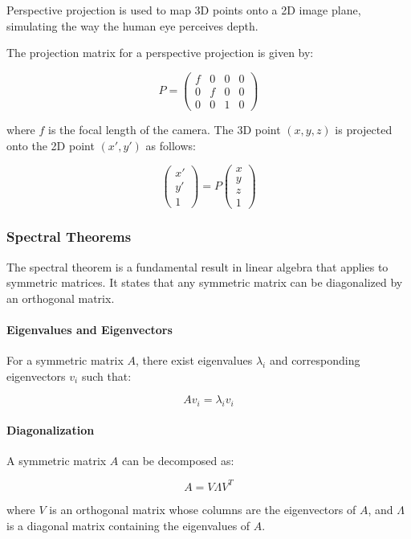 \documentclass[12pt]{article}
\begin{document}
Perspective projection is used to map 3D points onto a 2D image plane, simulating the way the human eye perceives depth.

The projection matrix for a perspective projection is given by:

\[
P =
\begin{pmatrix}
f & 0 & 0 & 0 \\
0 & f & 0 & 0 \\
0 & 0 & 1 & 0
\end{pmatrix}
\]

where \( f \) is the focal length of the camera. The 3D point \((x, y, z)\) is projected onto the 2D point \((x', y')\) as follows:

\[
\begin{pmatrix}
x' \\
y' \\
1
\end{pmatrix}
=
P
\begin{pmatrix}
x \\
y \\
z \\
1
\end{pmatrix}
\]

\subsubsection{Spectral Theorems}

The spectral theorem is a fundamental result in linear algebra that applies to symmetric matrices. It states that any symmetric matrix can be diagonalized by an orthogonal matrix.

\paragraph{Eigenvalues and Eigenvectors}

For a symmetric matrix \( A \), there exist eigenvalues \( \lambda_i \) and corresponding eigenvectors \( v_i \) such that:

\[
A v_i = \lambda_i v_i
\]

\paragraph{Diagonalization}

A symmetric matrix \( A \) can be decomposed as:

\[
A = V \Lambda V^T
\]

where \( V \) is an orthogonal matrix whose columns are the eigenvectors of \( A \), and \( \Lambda \) is a diagonal matrix containing the eigenvalues of \( A \).
\end{document}
